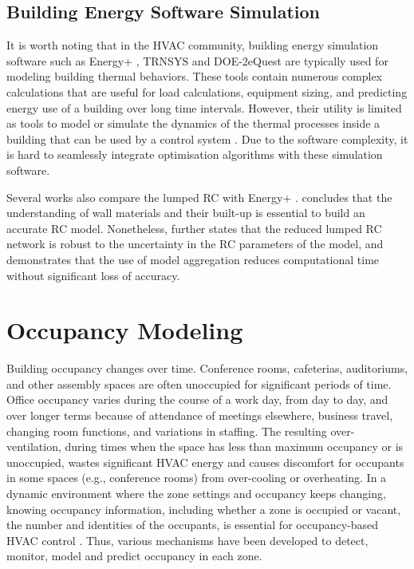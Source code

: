 \subsection{Building Energy Software Simulation}

It is worth noting that in the HVAC community, building energy simulation software such as Energy+ \citep{crawley2000energyplus}, TRNSYS \citep{university2010trnsys} and DOE-2\/eQuest \citep{hirsch2010equest} are typically used for modeling building thermal behaviors. These tools contain numerous complex calculations that are useful for load calculations, equipment sizing, and predicting energy use of a building over long time intervals. However, their utility is limited as tools to model or simulate the dynamics of the thermal processes inside a building that can be used by a control system \citep{goyal2011identification}. Due to the software complexity, it is hard to seamlessly integrate optimisation algorithms with these simulation software.

Several works also compare the lumped RC with Energy+ \citep{sturzenegger2012semi,dobbs2012automatic,eisenhower2012uncertainty}. \citep{sturzenegger2012semi} concludes that the understanding of wall materials and their built-up is essential to build an accurate RC model. Nonetheless, \citep{eisenhower2012uncertainty} further states that the reduced lumped RC network is robust to the uncertainty in the RC parameters of the model, and \citep{dobbs2012automatic} demonstrates that the use of model aggregation reduces computational time without significant loss of accuracy.


\section{Occupancy Modeling} \label{cha:bg:occ} 

Building occupancy changes over time. 
Conference rooms, cafeterias, auditoriums, and other assembly spaces are often unoccupied for significant periods of time. Office occupancy varies during the course of a work day, from day to day, and over longer terms because of attendance of meetings elsewhere, business travel, changing room functions, and variations in staffing. The resulting over-ventilation,
during times when the space has less than maximum occupancy or is unoccupied, wastes significant HVAC energy and causes discomfort for occupants in some spaces (e.g., conference rooms) from over-cooling or overheating. In a dynamic environment where the zone settings and occupancy keeps changing, knowing occupancy information, including whether a zone is occupied or vacant, the number and identities of the occupants, is essential for occupancy-based HVAC control \citep{erickson2010occupancy,nguyen2013energy}. Thus, various mechanisms have been developed to detect, monitor, model and predict occupancy in each zone. 

